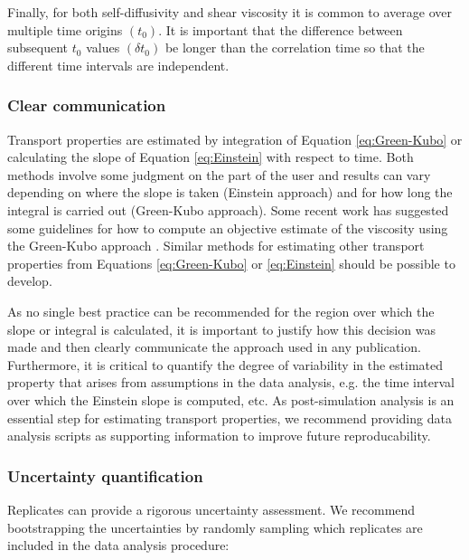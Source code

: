 \documentclass[9pt,bestpractices]{livecoms}
\begin{document}
Finally, for both self-diffusivity and shear viscosity it is common to average over multiple time origins $(t_0)$. It is important that the difference between subsequent $t_0$ values $(\delta t_0)$ be longer than the correlation time so that the different time intervals are independent.

\subsubsection{Clear communication} \label{sec:General: Clear communication}

Transport properties are estimated by integration of Equation \ref{eq:Green-Kubo} or calculating the slope of Equation \ref{eq:Einstein} with respect to time. Both methods involve some judgment on the part of the user and results can vary depending on where the slope is taken (Einstein approach) and for how long the integral is carried out (Green-Kubo approach). Some recent work has suggested some guidelines for how to compute an objective estimate of the viscosity using the Green-Kubo approach \cite{Zhang2015}. Similar methods for estimating other transport properties from Equations \ref{eq:Green-Kubo} or \ref{eq:Einstein} should be possible to develop. 

As no single best practice can be recommended for the region over which the slope or integral is calculated, it is important to justify how this decision was made and then clearly communicate the approach used in any publication. Furthermore, it is critical to quantify the degree of variability in the estimated property that arises from assumptions in the data analysis, e.g. the time interval over which the Einstein slope is computed, etc. As post-simulation analysis is an essential step for estimating transport properties, we recommend providing data analysis scripts as supporting information to improve future reproducability.

\subsubsection{Uncertainty quantification} \label{sec:General: Uncertainty}

Replicates can provide a rigorous uncertainty assessment. We recommend bootstrapping the uncertainties by randomly sampling which replicates are included in the data analysis procedure:
\end{document}
